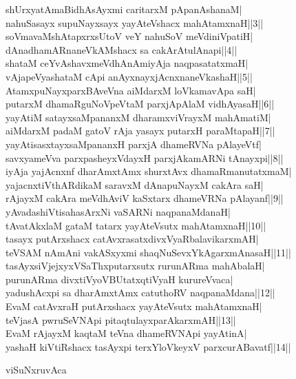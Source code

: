 \documentclass{article}
\begin{document}
shUrxyatAmaBidhAsAyxmi caritarxM pApanAshanaM|\\
nahuSasayx supuNayxsayx yayAteVshacx mahAtamxnaH||3||\\
soVmavaMshAtapxrxsUtoV veY nahuSoV meVdiniVpatiH|\\
dAnadhamARnaneVkAMshacx sa cakArAtulAnapi||4||\\
shataM ceYvAshavxmeVdhAnAmiyAja naqpasatatxmaH|\\
vAjapeVyashataM cApi anAyxnayxjAcnxnaneVkashaH||5||\\
AtamxpuNayxparxBAveVna aiMdarxM loVkamavApa saH|\\
putarxM dhamaRguNoVpeVtaM parxjApAlaM vidhAyasaH||6||\\
yayAtiM satayxsaMpananxM dharamxviVrayxM mahAmatiM|\\
aiMdarxM padaM gatoV rAja yasayx putarxH paraMtapaH||7||\\
yayAtisasxtayxsaMpananxH parxjA dhameRVNa pAlayeVtf|\\
savxyameVva parxpasheyxVdayxH parxjAkamARNi tAnayxpi||8||\\
iyAja yajAcnxnf dharAmxtAmx shurxtAvx dhamaRmanutatxmaM|\\
yajacnxtiVthARdikaM saravxM dAnapuNayxM cakAra saH|\\
rAjayxM cakAra meVdhAviV kaSxtarx dhameVRNa pAlayanf||9||\\
yAvadashiVtisahasArxNi vaSARNi naqpanaMdanaH|\\
tAvatAkxlaM gataM tatarx yayAteVsutx mahAtamxnaH||10||\\
tasayx putArxshacx catAvxrasatxdivxVyaRbalavikarxmAH|\\
teVSAM nAmAni vakASxyxmi shaqNuSevxYkAgarxmAnasaH||11||\\
tasAyxsiVjejxyxVSaThxputarxsutx rurunARma mahAbalaH|\\
purunARma divxtiVyoVBUtatxqtiVyaH kurureVvaca|\\
yadushAcxpi sa dharAmxtAmx catuthoRV naqpanaMdana||12||\\
EvaM catAvxraH putArxshacx yayAteVsutx mahAtamxnaH|\\
teVjasA pwruSeVNApi pitaqtulayxparAkarxmAH||13||\\
EvaM rAjayxM kaqtaM teVna dhameRVNApi yayAtinA|\\
yashaH kiVtiRshacx tasAyxpi terxYloVkeyxV parxcurABavatf||14||\\

\begin{center}
viSuNxruvAca
\end{center}
\end{document}

